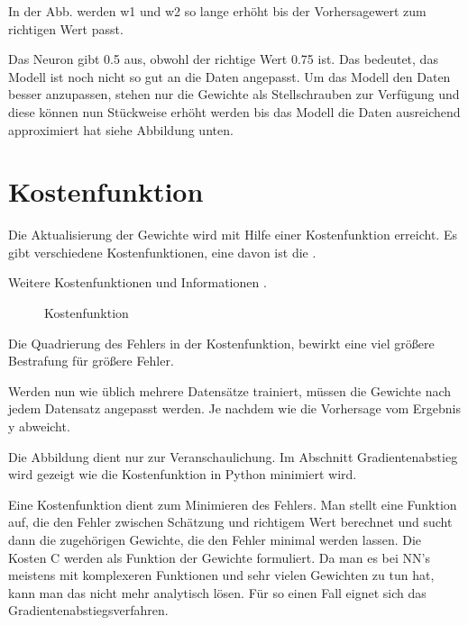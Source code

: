 \documentclass[letterpaper,10pt,english]{jupyterBook}
\let\sphinxpxdimen\pdfpxdimen\else\newdimen\sphinxpxdimen
\begin{document}
\sphinxAtStartPar
In der Abb. werden w1 und w2 so lange erhöht bis der Vorhersagewert zum richtigen Wert passt.

\sphinxAtStartPar
Das Neuron gibt 0.5 aus, obwohl der richtige Wert 0.75 ist. Das bedeutet, das Modell ist noch nicht so gut an die Daten angepasst. Um das Modell den Daten besser anzupassen, stehen nur die Gewichte als Stellschrauben zur Verfügung und diese können nun Stückweise erhöht werden bis das Modell die Daten ausreichend approximiert hat siehe Abbildung unten.


\section{Kostenfunktion}
\label{\detokenize{02_NN/NN_learning:kostenfunktion}}
\sphinxAtStartPar
Die Aktualisierung der Gewichte wird mit Hilfe einer Kostenfunktion erreicht. Es gibt verschiedene Kostenfunktionen, eine davon ist die .

\sphinxAtStartPar
Weitere Kostenfunktionen und Informationen .

\begin{figure}[htbp]
\centering
\capstart

\noindent\sphinxincludegraphics[width=750\sphinxpxdimen]{{weights_1}.png}
\caption{Kostenfunktion}\label{\detokenize{02_NN/NN_learning:id1}}\end{figure}

\sphinxAtStartPar
Die Quadrierung des Fehlers in der Kostenfunktion, bewirkt eine viel größere Bestrafung für größere Fehler.

\sphinxAtStartPar
Werden nun wie üblich mehrere Datensätze trainiert, müssen die Gewichte nach jedem Datensatz angepasst werden. Je nachdem wie die Vorhersage vom Ergebnis y abweicht.

\sphinxAtStartPar
Die Abbildung dient nur zur Veranschaulichung. Im Abschnitt Gradientenabstieg wird gezeigt wie die Kostenfunktion in Python minimiert wird.

\sphinxAtStartPar
Eine Kostenfunktion dient zum Minimieren des Fehlers. Man stellt eine Funktion auf, die den Fehler zwischen Schätzung und richtigem Wert berechnet und sucht dann die zugehörigen Gewichte, die den Fehler minimal werden lassen. Die Kosten C werden als Funktion der Gewichte formuliert. Da man es bei NN’s meistens mit komplexeren Funktionen und sehr vielen Gewichten zu tun hat, kann man das nicht mehr analytisch lösen. Für so einen Fall eignet sich das Gradientenabstiegsverfahren.
\end{document}
